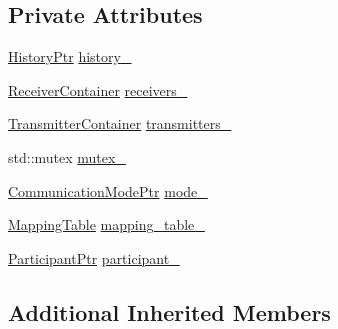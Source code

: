 \subsection*{Private Attributes}
\begin{DoxyCompactItemize}
\item 
\hyperlink{classapollo_1_1cyber_1_1transport_1_1HybridReceiver_a29d008855b7b25d060137a19da928c53}{History\-Ptr} \hyperlink{classapollo_1_1cyber_1_1transport_1_1HybridReceiver_a71fe92773a83ee153382b6b7f9e8c8a7}{history\-\_\-}
\item 
\hyperlink{classapollo_1_1cyber_1_1transport_1_1HybridReceiver_a70475c40e8f9c33ebd8126df3ab71e18}{Receiver\-Container} \hyperlink{classapollo_1_1cyber_1_1transport_1_1HybridReceiver_a1f74e7e19cf92397729389922da60d57}{receivers\-\_\-}
\item 
\hyperlink{classapollo_1_1cyber_1_1transport_1_1HybridReceiver_a6295cabae20a58ee02454f59d9c09986}{Transmitter\-Container} \hyperlink{classapollo_1_1cyber_1_1transport_1_1HybridReceiver_a0763ec6d7247a952123cdc5a0c2fa7f2}{transmitters\-\_\-}
\item 
std\-::mutex \hyperlink{classapollo_1_1cyber_1_1transport_1_1HybridReceiver_acd72be19a7680b7c7e87593e7803f016}{mutex\-\_\-}
\item 
\hyperlink{classapollo_1_1cyber_1_1transport_1_1HybridReceiver_aec763c6c2f52e839f873b00193627626}{Communication\-Mode\-Ptr} \hyperlink{classapollo_1_1cyber_1_1transport_1_1HybridReceiver_a2b1451e2a1668ed26172ebaf33520e58}{mode\-\_\-}
\item 
\hyperlink{classapollo_1_1cyber_1_1transport_1_1HybridReceiver_abefb4dc42db917f5891670997814231c}{Mapping\-Table} \hyperlink{classapollo_1_1cyber_1_1transport_1_1HybridReceiver_aee5d1880835e3edba742fbcf89478e2d}{mapping\-\_\-table\-\_\-}
\item 
\hyperlink{namespaceapollo_1_1cyber_1_1transport_a4214d0780331276d0384d0b57e3bc688}{Participant\-Ptr} \hyperlink{classapollo_1_1cyber_1_1transport_1_1HybridReceiver_ae166879e80acc07e56f178f50eac3fd4}{participant\-\_\-}
\end{DoxyCompactItemize}
\subsection*{Additional Inherited Members}


